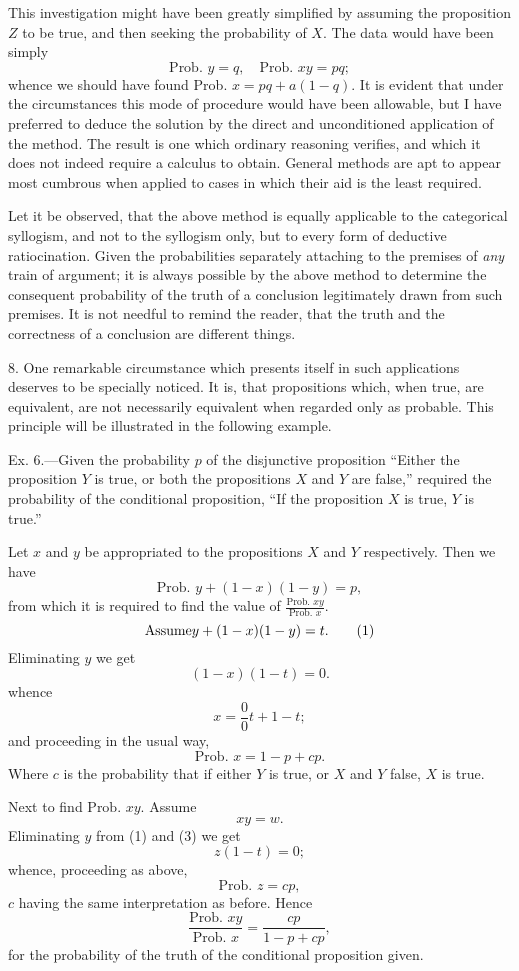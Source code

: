 \documentclass[oneside]{book}
\begin{document}
This investigation might have been greatly simplified by assuming
the proposition $Z$ to be true, and then seeking the probability
of $X$. The data would have been simply
\[
  \text{Prob. }y = q,\quad  \text{Prob. }xy = pq;
\]
whence we should have found Prob. $x = pq + a (1-q)$. It is
evident that under the circumstances this mode of procedure
would have been allowable, but I have preferred to deduce the
solution by the direct and unconditioned application of the
method. The result is one which ordinary reasoning verifies,
and which it does not indeed require a calculus to obtain. General
methods are apt to appear most cumbrous when applied to
cases in which their aid is the least required.

Let it be observed, that the above method is equally applicable
to the categorical syllogism, and not to the syllogism only,
but to every form of deductive ratiocination. Given the probabilities
separately attaching to the premises of \emph{any} train of argument;
it is always possible by the above method to determine
the consequent probability of the truth of a conclusion legitimately
drawn from such premises. It is not needful to remind the
reader, that the truth and the correctness of a conclusion are different
things.

8. One remarkable circumstance which presents itself in such
applications deserves to be specially noticed. It is, that propositions
which, when true, are equivalent, are not necessarily
equivalent when regarded only as probable. This principle will
be illustrated in the following example.

Ex. 6.---Given the probability $p$ of the disjunctive proposition
``Either the proposition $Y$ is true, or both the propositions $X$ and
$Y$ are false,'' required the probability of the conditional proposition,
``If the proposition $X$ is true, $Y$ is true.''

Let $x$ and $y$ be appropriated to the propositions $X$ and $Y$
respectively. Then we have
\[
\text{Prob. }y + (1-x) (1-y) = p,
\]
from which it is required to find the value of
$\frac{\text{Prob. }xy}{\text{Prob. }x}$.
\[
  \text{Assume}\hfill  y + (1-x) (1-y) = t.  \hfill\tag{1}
\]
Eliminating $y$ we get
\[
(1-x) (1-t) = 0.
\]
whence
\[
x=\frac{0}{0} t + 1 - t;
\]
and proceeding in the usual way,
\[
\text{Prob. }x = 1-p + cp.     \tag{2}
\]
Where $c$ is the probability that if either $Y$ is true, or $X$ and $Y$
false, $X$ is true.

Next to find $\text{Prob. }xy$. Assume
\[
xy = w.          \tag{3}
\]
Eliminating $y$ from (1) and (3) we get
\[
z (1-t) = 0;
\]
whence, proceeding as above,
\[
\text{Prob. }z = cp,
\]
$c$ having the same interpretation as before. Hence
\[
\frac{\text{Prob. }xy}{\text{Prob. }x} = \frac{cp}{1-p+cp},
\]
for the probability of the truth of the conditional proposition
given.
\end{document}
